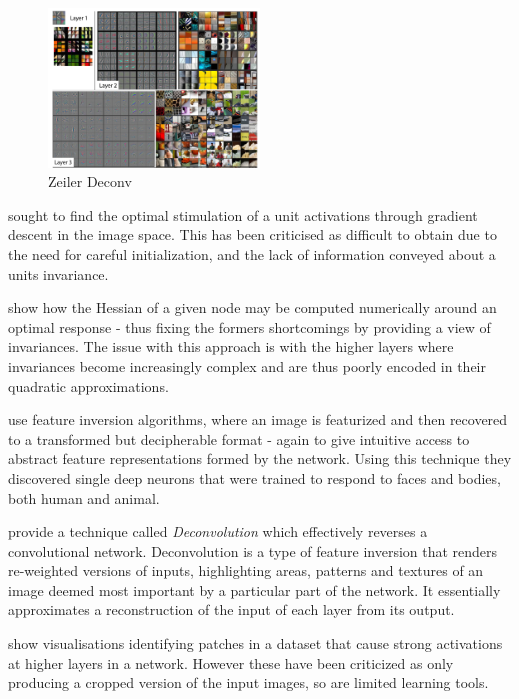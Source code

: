 \documentclass[a4paper,11pt,titlepage]{article}
\begin{document}
		\begin{figure}[H]
			\centering	
    			\includegraphics[width=0.5\textwidth]{img/zeiler_deconv.png} 
    			\caption{Zeiler Deconv}%
 		\end{figure}
 		
 		
		\par 
		\textbf{\cite{Erhan2009}} sought to find the optimal stimulation of a unit activations through gradient descent in the image space. This has been criticised as difficult to obtain due to the need for careful initialization, and the lack of information conveyed about a units invariance. 
		\par 
		\textbf{\cite{Le2010}} show how the Hessian of a given node may be computed numerically around an optimal response - thus fixing the formers shortcomings by providing a view of invariances. The issue with this approach is with the higher layers where invariances become increasingly complex and are thus poorly encoded in their quadratic approximations. 
		\par 
		\textbf{\cite{Vondrick2013a}} use feature inversion algorithms, where an image is featurized and then recovered to a transformed but decipherable format - again to give intuitive access to abstract feature representations formed by the network. Using this technique they discovered single deep neurons that were trained to respond to faces and bodies, both human and animal. 
		\par 
		\textbf{\cite{Zeiler2013}} provide a technique called \textit{Deconvolution} \cite{Zeiler2011} which effectively reverses a convolutional network. Deconvolution is a type of feature inversion that renders re-weighted versions of inputs, highlighting areas, patterns and textures of an image deemed most important by a particular part of the network. It essentially approximates a reconstruction of the input of each layer from its output.
		\par
		\textbf{\cite{Donahue2013}} show visualisations identifying patches in a dataset that cause strong activations at higher layers in a network. However these have been criticized as only producing a cropped version of the input images, so are limited learning tools. 
\end{document}
